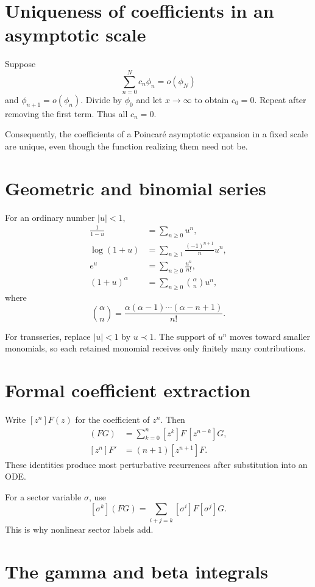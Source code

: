 \documentclass[11pt,openany]{book}
\theoremstyle{definition}
\theoremstyle{plain}
\theoremstyle{remark}
\newcommand{\precdom}{\prec}
\begin{document}
\section{Uniqueness of coefficients in an asymptotic scale}

Suppose
\[
 \sum_{n=0}^{N}c_n\phi_n=o(\phi_N)
\]
and $\phi_{n+1}=o(\phi_n)$. Divide by $\phi_0$ and let $x\to\infty$ to obtain $c_0=0$. Repeat after removing the first term. Thus all $c_n=0$.

Consequently, the coefficients of a Poincar\'e asymptotic expansion in a fixed scale are unique, even though the function realizing them need not be.

\section{Geometric and binomial series}

For an ordinary number $|u|<1$,
\begin{align*}
 \frac1{1-u}&=\sum_{n\ge0}u^n,\\
 \log(1+u)&=\sum_{n\ge1}\frac{(-1)^{n+1}}n u^n,\\
 e^u&=\sum_{n\ge0}\frac{u^n}{n!},\\
 (1+u)^\alpha&=\sum_{n\ge0}\binom\alpha n u^n,
\end{align*}
where
\[
 \binom\alpha n
 =\frac{\alpha(\alpha-1)\cdots(\alpha-n+1)}{n!}.
\]

For transseries, replace $|u|<1$ by $u\precdom1$. The support of $u^n$ moves toward smaller monomials, so each retained monomial receives only finitely many contributions.

\section{Formal coefficient extraction}

Write $[z^n]F(z)$ for the coefficient of $z^n$. Then
\begin{align*}
 [z^n](FG)&=\sum_{k=0}^n[z^k]F\,[z^{n-k}]G,\\
 [z^n]F'&=(n+1)[z^{n+1}]F.
\end{align*}
These identities produce most perturbative recurrences after substitution into an ODE.

For a sector variable $\sigma$, use
\[
 [\sigma^k](FG)=\sum_{i+j=k}[\sigma^i]F[\sigma^j]G.
\]
This is why nonlinear sector labels add.

\section{The gamma and beta integrals}
\end{document}
